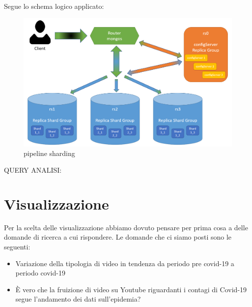 \documentclass[10pt, a4paper,openany]{article}
\begin{document}
Segue lo schema logico applicato:
\begin{figure}[H]
	\centering
	\includegraphics[width=0.8\linewidth]{pics/sharding.png}
	\caption{pipeline sharding}
\end{figure}

QUERY ANALISI:




\section*{Visualizzazione}
Per la scelta delle visualizzazione abbiamo dovuto pensare per prima cosa a delle domande di ricerca a cui rispondere. Le domande che ci siamo posti sono le seguenti:
\begin{itemize}
	\item Variazione della tipologia di video in tendenza da periodo pre covid-19 a periodo covid-19
	\item È vero che la fruizione di video su Youtube riguardanti i contagi di Covid-19 segue l'andamento dei dati sull'epidemia?
\end{itemize}
\end{document}
